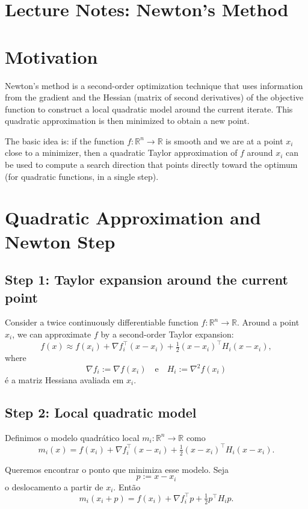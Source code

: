 \documentclass[9pt,a4paper]{extarticle}
\begin{document}
\section*{Lecture Notes: Newton's Method}

\section{Motivation}

Newton's method is a second-order optimization technique that uses information
from the gradient and the Hessian (matrix of second derivatives) of the objective
function to construct a local quadratic model around the current iterate. This
quadratic approximation is then minimized to obtain a new point.

The basic idea is: if the function $f:\mathbb{R}^n\to\mathbb{R}$ is smooth and
we are at a point $x_i$ close to a minimizer, then a quadratic Taylor
approximation of $f$ around $x_i$ can be used to compute a search direction that
points directly toward the optimum (for quadratic functions, in a single step).

\section{Quadratic Approximation and Newton Step}

\subsection*{Step 1: Taylor expansion around the current point}

Consider a twice continuously differentiable function $f:\mathbb{R}^n \to \mathbb{R}$.
Around a point $x_i$, we can approximate $f$ by a second-order Taylor expansion:
\[
f(x) \approx f(x_i)
+ \nabla f_i^\top (x - x_i)
+ \tfrac12 (x - x_i)^\top H_i (x - x_i),
\]
where
\[
\nabla f_i := \nabla f(x_i)
\quad\text{e}\quad
H_i := \nabla^2 f(x_i)
\]
é a matriz Hessiana avaliada em $x_i$.

\subsection*{Step 2: Local quadratic model}

Definimos o modelo quadrático local $m_i:\mathbb{R}^n\to\mathbb{R}$ como
\[
m_i(x)
= f(x_i)
+ \nabla f_i^\top (x - x_i)
+ \tfrac12 (x - x_i)^\top H_i (x - x_i).
\]

Queremos encontrar o ponto que minimiza esse modelo. Seja
\[
p := x - x_i
\]
o deslocamento a partir de $x_i$. Então
\[
m_i(x_i + p)
= f(x_i) + \nabla f_i^\top p + \tfrac12 p^\top H_i p.
\]
\end{document}
